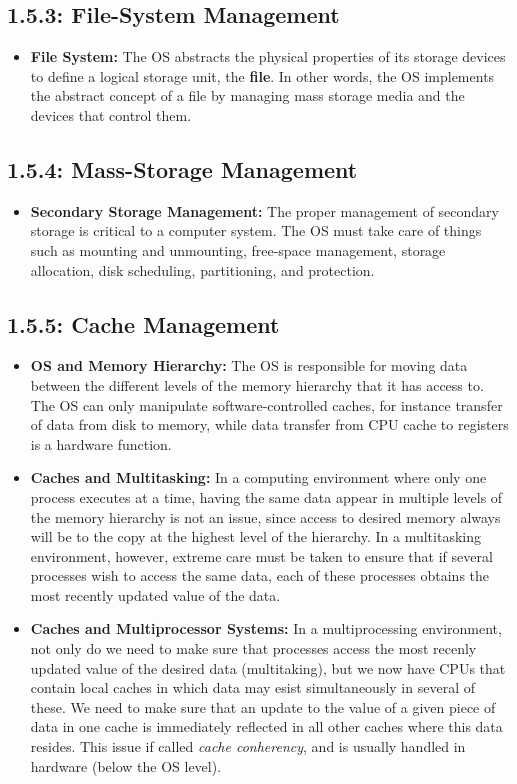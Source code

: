\documentclass[12pt]{article}
\begin{document}
\subsection*{1.5.3: File-System Management}

\begin{itemize}
    \item \textbf{File System:} The OS abstracts the physical properties of its storage devices to define a logical storage unit, the \textbf{file}. In other words, the OS implements the abstract concept of a file by managing mass storage media and the devices that control them.
\end{itemize}

\subsection*{1.5.4: Mass-Storage Management}

\begin{itemize}
    \item \textbf{Secondary Storage Management:} The proper management of secondary storage is critical to a computer system. The OS must take care of things such as mounting and unmounting, free-space management, storage allocation, disk scheduling, partitioning, and protection.
\end{itemize}

\subsection*{1.5.5: Cache Management}

\begin{itemize}
    \item \textbf{OS and Memory Hierarchy:} The OS is responsible for moving data between the different levels of the memory hierarchy that it has access to. The OS can only manipulate software-controlled caches, for instance transfer of data from disk to memory, while data transfer from CPU cache to registers is a hardware function.
    \item \textbf{Caches and Multitasking:} In a computing environment where only one process executes at a time, having the same data appear in multiple levels of the memory hierarchy is not an issue, since access to desired memory always will be to the copy at the highest level of the hierarchy. In a multitasking environment, however, extreme care must be taken to ensure that if several processes wish to access the same data, each of these processes obtains the most recently updated value of the data.
    \item \textbf{Caches and Multiprocessor Systems:} In a multiprocessing environment, not only do we need to make sure that processes access the most recenly updated value of the desired data (multitaking), but we now have CPUs that contain local caches in which data may esist simultaneously in several of these. We need to make sure that an update to the value of a given piece of data in one cache is immediately reflected in all other caches where this data resides. This issue if called \textit{cache conherency}, and is usually handled in hardware (below the OS level).
\end{itemize}
\end{document}

